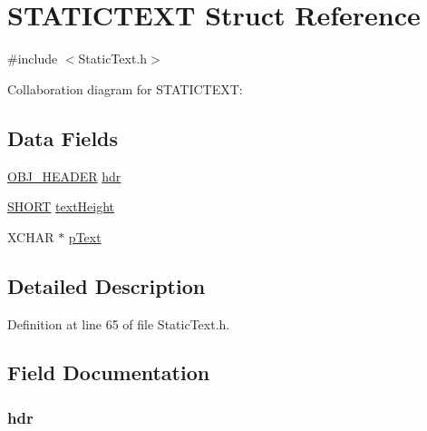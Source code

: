 \hypertarget{struct_s_t_a_t_i_c_t_e_x_t}{}\section{S\+T\+A\+T\+I\+C\+T\+E\+X\+T Struct Reference}
\label{struct_s_t_a_t_i_c_t_e_x_t}


{\ttfamily \#include $<$Static\+Text.\+h$>$}



Collaboration diagram for S\+T\+A\+T\+I\+C\+T\+E\+X\+T\+:
\subsection*{Data Fields}
\begin{DoxyCompactItemize}
\item 
\hyperlink{struct_o_b_j___h_e_a_d_e_r}{O\+B\+J\+\_\+\+H\+E\+A\+D\+E\+R} \hyperlink{struct_s_t_a_t_i_c_t_e_x_t_abeffaf353197a8a64fba6707b68ce0be}{hdr}
\item 
\hyperlink{_generic_type_defs_8h_ae9bb25d3afecf3bfab0fbe3c22c2050f}{S\+H\+O\+R\+T} \hyperlink{struct_s_t_a_t_i_c_t_e_x_t_a40fa9c35391b0005032180b85e7afd34}{text\+Height}
\item 
X\+C\+H\+A\+R $\ast$ \hyperlink{struct_s_t_a_t_i_c_t_e_x_t_a934b5563cdaf14803728ff3a7b7e8c7f}{p\+Text}
\end{DoxyCompactItemize}


\subsection{Detailed Description}


Definition at line 65 of file Static\+Text.\+h.



\subsection{Field Documentation}
\hypertarget{struct_s_t_a_t_i_c_t_e_x_t_abeffaf353197a8a64fba6707b68ce0be}{}
\subsubsection[{hdr}]{ hdr}\label{struct_s_t_a_t_i_c_t_e_x_t_abeffaf353197a8a64fba6707b68ce0be}


